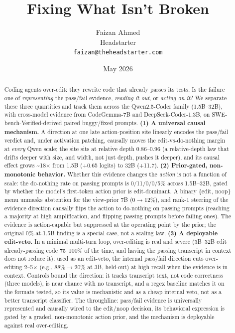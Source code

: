 \documentclass[
  11pt,
  a4paper]{article}
\title{\textbf{Fixing What Isn't Broken}}
\author{Faizan Ahmed \\ Headstarter \\ \texttt{faizan@theheadstarter.com}}
\date{May 2026}
\begin{document}
\maketitle
\begin{abstract}
Coding agents over-edit: they rewrite code that already passes its
tests. Is the failure one of \emph{representing} the pass/fail evidence,
\emph{reading it out}, or \emph{acting on it}? We separate these three
quantities and track them across the Qwen2.5-Coder family (1.5B--32B),
with cross-model evidence from CodeGemma-7B and DeepSeek-Coder-1.3B, on
SWE-bench-Verified-derived paired buggy/fixed prompts. \textbf{(1) A
universal causal mechanism.} A direction at one late action-position
site linearly encodes the pass/fail verdict and, under activation
patching, causally moves the edit-vs-do-nothing margin at \emph{every}
Qwen scale; the site sits at relative depth 0.86--0.96 (a relative-depth
law that drifts deeper with size, and width, not just depth, pushes it
deeper), and its causal effect grows \textasciitilde18\ensuremath{\times} from 1.5B (+0.65
logits) to 32B (+11.7). \textbf{(2) Prior-gated, non-monotonic
behavior.} Whether this evidence changes the \emph{action} is not a
function of scale: the do-nothing rate on passing prompts is
0/11/0/0/5\% across 1.5B--32B, gated by whether the model's first-token
action prior is edit-dominant. A binary \{edit, noop\} menu unmasks
abstention for the view-prior 7B (0\ensuremath{\rightarrow}12\%), and rank-1 steering of the
evidence direction causally flips the action to do-nothing on passing
prompts (reaching a majority at high amplification, and flipping passing
prompts before failing ones). The evidence is action-capable but
suppressed at the operating point by the prior; the original 0\%-at-1.5B
finding is a special case, not a scaling law. \textbf{(3) A deployable
edit-veto.} In a minimal multi-turn loop, over-editing is real and
severe (3B--32B edit already-passing code 75--100\% of the time, and
having the passing transcript in context does not reduce it); used as an
edit-veto, the internal pass/fail direction cuts over-editing 2--5\ensuremath{\times}
(e.g., 88\%\ensuremath{\rightarrow}20\% at 3B, held-out) at high recall when the evidence is in
context. Controls bound the direction: it tracks transcript text, not
code correctness (three models), is near chance with no transcript, and
a regex baseline matches it on the formats tested, so its value is
mechanistic and as a cheap internal veto, not as a better transcript
classifier. The throughline: pass/fail evidence is universally
represented and causally wired to the edit/noop decision, its behavioral
expression is gated by a graded, non-monotonic action prior, and the
mechanism is deployable against real over-editing.
\end{abstract}
\end{document}
